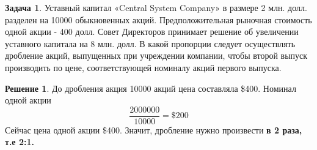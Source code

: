 \documentclass[a4paper, 14pt]{article}
\theoremstyle{plain} %
\theoremstyle{definition} %
\newtheorem*{solution}{Решение}
\newtheorem{problem}{Задача}[subsection]
\theoremstyle{remark} %
\begin{document}
\begin{problem}
	Уставный капитал «Central System Company» в размере 2 млн. долл. разделен на 10000 обыкновенных акций. Предположительная рыночная стоимость одной акции - 400 долл. Совет Директоров принимает решение об увеличении уставного капитала на 8 млн. долл. В какой пропорции следует осуществлять дробление акций, выпущенных при учреждении компании, чтобы второй выпуск производить по цене, соответствующей номиналу акций первого выпуска.
	\begin{solution}
		До дробления акция 10000 акций цена составляла \$400. Номинал одной акции
		\[
			\frac{2000000}{10000} = \$200
		\]
		Сейчас цена одной акции \$400. Значит, дробление нужно произвести \textbf{в 2 раза, т.е 2:1.}
	\end{solution}
\end{problem}
\end{document}
